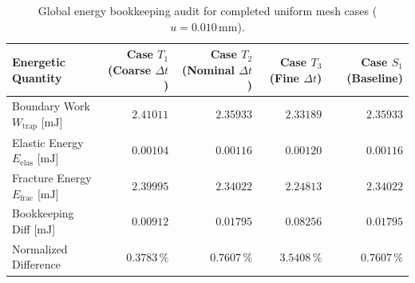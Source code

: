 \begin{table}[htbp]
\centering
\caption{Global energy bookkeeping audit for completed uniform mesh cases ($u = 0.010\,\text{mm}$).}
\label{tab:energy_audit_thesis}
\small
\begin{tabular}{lrrrr}
\toprule
\textbf{Energetic Quantity} & \textbf{Case $T_1$ (Coarse $\Delta t$)} & \textbf{Case $T_2$ (Nominal $\Delta t$)} & \textbf{Case $T_3$ (Fine $\Delta t$)} & \textbf{Case $S_1$ (Baseline)} \\
\midrule
Boundary Work $W_{\mathrm{trap}}$ [$\text{mJ}$] & $2.41011$ & $2.35933$ & $2.33189$ & $2.35933$ \\
Elastic Energy $E_{\mathrm{elas}}$ [$\text{mJ}$] & $0.00104$ & $0.00116$ & $0.00120$ & $0.00116$ \\
Fracture Energy $E_{\mathrm{frac}}$ [$\text{mJ}$] & $2.39995$ & $2.34022$ & $2.24813$ & $2.34022$ \\
Bookkeeping Diff [$\text{mJ}$] & $0.00912$ & $0.01795$ & $0.08256$ & $0.01795$ \\
Normalized Difference & $\mathbf{0.3783\,\%}$ & $\mathbf{0.7607\,\%}$ & $\mathbf{3.5408\,\%}$ & $\mathbf{0.7607\,\%}$ \\
\bottomrule
\end{tabular}
\end{table}
